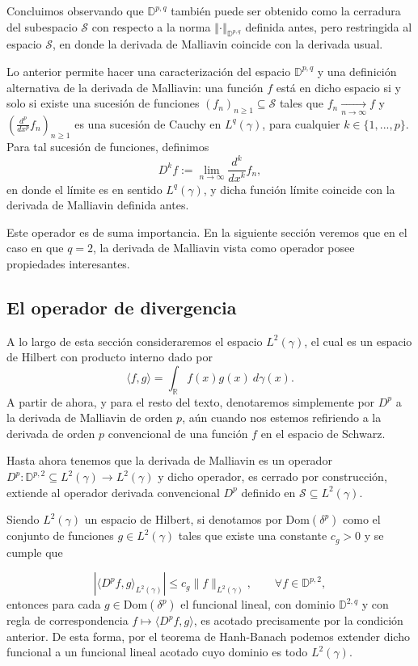 \documentclass[letterpaper,twoside,12pt]{book}
\newcommand{\R}{\mathbb{R}}
\newcommand{\D}{\mathbb{D}}
\renewcommand{\S}{\mathcal{S}}
\newcommand{\1}{\mathds{1}}
\newcommand{\abs}[1]{\left\lvert #1 \right\rvert}
\renewcommand{\to}{\rightarrow}
\newcommand{\norm}[1]{\left\Vert #1 \right\Vert}
\theoremstyle{definition}
\theoremstyle{definition}
\theoremstyle{remark}
\theoremstyle{definition}
\theoremstyle{definition}
\theoremstyle{definition}
\theoremstyle{definition}
\theoremstyle{definition}
\begin{document}
Concluimos observando que $\D^{p,q}$ también puede ser obtenido como la cerradura del subespacio $\S$ con respecto a la norma $\norm{\cdot}_{\D^{p,q}}$ definida antes, pero restringida al espacio $\S$, en donde la derivada de Malliavin coincide con la derivada usual.

Lo anterior permite hacer una caracterización del espacio $\D^{p,q}$ y una definición alternativa de la derivada de Malliavin: una función $f$ está en dicho espacio si y solo si existe una sucesión de funciones $(f_n)_{n\geq1}\subseteq \S$ tales que $f_n\xrightarrow[n\to\infty]{}f$ y $(\frac{d^{p}}{dx^{p}}f_n)_{n\geq1}$ es una sucesión de Cauchy en $L^q(\gamma)$, para cualquier $k\in \{1,...,p\}$. Para tal sucesión de funciones, definimos 
\[
D^{k}f:=\lim_{n\to \infty}\frac{d^k}{dx^{k}}f_n,
\]
en donde el límite es en sentido $L^{q}(\gamma)$, y dicha función límite coincide con la derivada de Malliavin definida antes.

Este operador es de suma importancia. En la siguiente sección veremos que en el caso en que $q=2$, la derivada de Malliavin vista como operador posee propiedades interesantes.

\subsection{El operador de divergencia}

A lo largo de esta sección consideraremos el espacio $L^2(\gamma)$, el cual es un espacio de Hilbert con producto interno dado por 
\[
\langle f,g\rangle=\int_\R f(x)g(x)\ d\gamma(x).
\]
A partir de ahora, y para el resto del texto, denotaremos simplemente por $D^{p}$ a la derivada de Malliavin de orden $p$, aún cuando nos estemos refiriendo a la derivada de orden $p$ convencional de una función $f$ en el espacio de Schwarz.

Hasta ahora tenemos que la derivada de Malliavin es un operador $D^{p}:\mathbb{D}^{p,2}\subseteq L^2(\gamma)\longrightarrow L^2(\gamma)$ y dicho operador, es cerrado por construcción, extiende al operador derivada convencional $D^{p}$ definido en $\mathcal{S}\subseteq L^2(\gamma)$. 

Siendo $L^{2}(\gamma)$ un espacio de Hilbert, si denotamos por $\text{Dom}(\delta^{p})$ como el conjunto de funciones $g\in L^{2}(\gamma)$ tales que existe una constante $c_g>0$ y se cumple que

\[
\abs{\langle D^{p}f,g\rangle_{L^2(\gamma)}}\leq c_g\|f\|_{L^2(\gamma)}, \qquad \forall f\in \mathbb{D}^{p,2},                 
\]
entonces para cada $g\in \text{Dom}(\delta^{p})$ el funcional lineal, con dominio $\D^{2,q}$ y con regla de correspondencia $f\longmapsto \langle D^{p}f,g\rangle$, es acotado precisamente por la condición anterior. De esta forma, por el teorema de Hanh-Banach podemos extender dicho funcional a un funcional lineal acotado cuyo dominio es todo $L^2(\gamma)$.
\end{document}
